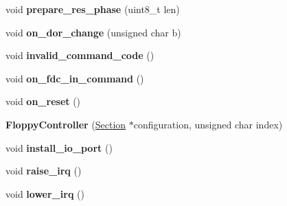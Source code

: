 \begin{DoxyCompactItemize}
\item 
\hypertarget{classFloppyController_af6109e74b547dba1cc2c7f999ec1dae0}{void {\bfseries prepare\-\_\-res\-\_\-phase} (uint8\-\_\-t len)}\label{classFloppyController_af6109e74b547dba1cc2c7f999ec1dae0}

\item 
\hypertarget{classFloppyController_af3a14c5fbbbeba2e99d93a82bb4d68a8}{void {\bfseries on\-\_\-dor\-\_\-change} (unsigned char b)}\label{classFloppyController_af3a14c5fbbbeba2e99d93a82bb4d68a8}

\item 
\hypertarget{classFloppyController_a09582cc4d601a0f9d10de755cd45536f}{void {\bfseries invalid\-\_\-command\-\_\-code} ()}\label{classFloppyController_a09582cc4d601a0f9d10de755cd45536f}

\item 
\hypertarget{classFloppyController_a85985bfd263e73e410be50a6fe9d0cd3}{void {\bfseries on\-\_\-fdc\-\_\-in\-\_\-command} ()}\label{classFloppyController_a85985bfd263e73e410be50a6fe9d0cd3}

\item 
\hypertarget{classFloppyController_a2d17aad1dbcd65d815cdbad1463b9d8e}{void {\bfseries on\-\_\-reset} ()}\label{classFloppyController_a2d17aad1dbcd65d815cdbad1463b9d8e}

\item 
\hypertarget{classFloppyController_a94198f8d6635bbbad16c54bb8837717c}{{\bfseries Floppy\-Controller} (\hyperlink{classSection}{Section} $\ast$configuration, unsigned char index)}\label{classFloppyController_a94198f8d6635bbbad16c54bb8837717c}

\item 
\hypertarget{classFloppyController_a94fdb6876c90cb26c8df44dff3074a13}{void {\bfseries install\-\_\-io\-\_\-port} ()}\label{classFloppyController_a94fdb6876c90cb26c8df44dff3074a13}

\item 
\hypertarget{classFloppyController_a3a78477511b7fdbb8400f3ce5b931e74}{void {\bfseries raise\-\_\-irq} ()}\label{classFloppyController_a3a78477511b7fdbb8400f3ce5b931e74}

\item 
\hypertarget{classFloppyController_a4a16e8af2ed357fc837709a88673dfe3}{void {\bfseries lower\-\_\-irq} ()}\label{classFloppyController_a4a16e8af2ed357fc837709a88673dfe3}

\end{DoxyCompactItemize}
